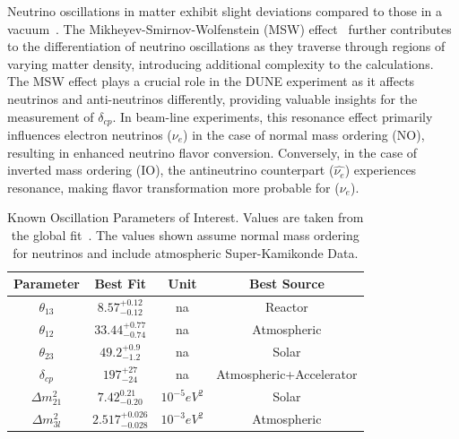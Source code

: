 Neutrino oscillations in matter exhibit slight deviations compared to those in a vacuum~\citep{PhysRevD.17.2369}.
The Mikheyev-Smirnov-Wolfenstein (MSW) effect~\citep{Smirnov2004TheME} further contributes to the differentiation of neutrino oscillations as they traverse through regions of varying matter density, introducing additional complexity to the calculations.
The MSW effect plays a crucial role in the DUNE experiment as it affects neutrinos and anti-neutrinos differently, providing valuable insights for the measurement of $\delta_{cp}$.
In beam-line experiments, this resonance effect primarily influences electron neutrinos ($\nu_{e}$) in the case of normal mass ordering (NO), resulting in enhanced neutrino flavor conversion.
Conversely, in the case of inverted mass ordering (IO), the antineutrino counterpart ($\hat{\nu_{e}}$) experiences resonance, making flavor transformation more probable for ($\nu_{e}$).
\begin{table}
\begin{center}
\begin{tabular}{||c c c c||}
 \hline
 Parameter & Best Fit & Unit & Best Source\\ [0.5ex]
 \hline\hline
  $\theta_{13}$ & $8.57^{+0.12}_{-0.12}$ & na & Reactor \\ %
 \hline
  $\theta_{12}$ & $33.44^{+0.77}_{-0.74}$ & na & Atmospheric \\ %
 \hline
  $\theta_{23}$ & $49.2^{+0.9}_{-1.2}$ & na & Solar \\ %
 \hline
  $\delta_{cp}$ & $197^{+27}_{-24}$ & na & Atmospheric+Accelerator \\ %
 \hline
  $\Delta m_{21}^{2}$ & $7.42^{0.21}_{-0.20}$ & $10^{-5}eV^{2}$ & Solar \\ %
 \hline
  $\Delta m_{3l}^{2}$ & $2.517^{+0.026}_{-0.028}$ & $10^{-3}eV^{2}$ & Atmospheric  \\
 \hline
\end{tabular}
\caption{Known Oscillation Parameters of Interest.
Values are taken from the global fit~\citep{2020JHEP...09..178E}.
The values shown assume normal mass ordering for neutrinos and include atmospheric Super-Kamikonde Data.
}
\label{table:pmns_params}
\end{center}
\end{table}

